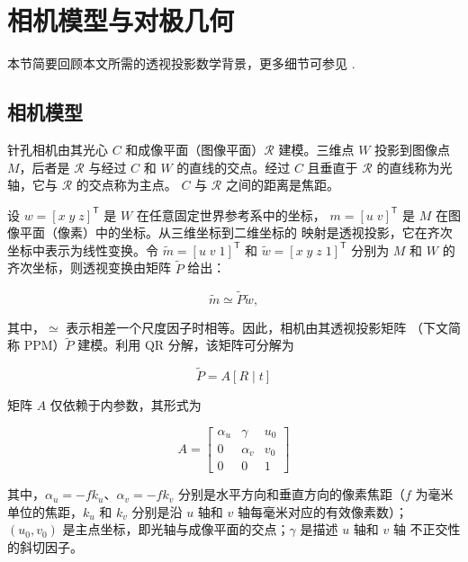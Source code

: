 
\section{相机模型与对极几何}
\label{sec:camera-model-epipolar-geometry}

本节简要回顾本文所需的透视投影数学背景，更多细节可参见
\citet{faugeras1993}.

\subsection{相机模型}
\label{sec:camera-model}

针孔相机由其光心 $C$ 和成像平面（图像平面）$\mathcal{R}$ 建模。三维点
$W$ 投影到图像点 $M$，后者是 $\mathcal{R}$ 与经过 $C$ 和 $W$ 的直线的交点。经过
$C$ 且垂直于 $\mathcal{R}$ 的直线称为光轴，它与 $\mathcal{R}$ 的交点称为主点。
$C$ 与 $\mathcal{R}$ 之间的距离是焦距。

设 $w=[x\;y\;z]^{\mathsf T}$ 是 $W$ 在任意固定世界参考系中的坐标，
$m=[u\;v]^{\mathsf T}$ 是 $M$ 在图像平面（像素）中的坐标。从三维坐标到二维坐标的
映射是透视投影，它在齐次坐标中表示为线性变换。令
$\tilde{m}=[u\;v\;1]^{\mathsf T}$ 和 $\tilde{w}=[x\;y\;z\;1]^{\mathsf T}$ 分别为
$M$ 和 $W$ 的齐次坐标，则透视变换由矩阵 $\widetilde{P}$ 给出：

\begin{equation}
  \tilde{m}\simeq \widetilde{P}\tilde{w},
  \label{eq:perspective-projection}
\end{equation}

其中，$\simeq$ 表示相差一个尺度因子时相等。因此，相机由其透视投影矩阵
（下文简称 PPM）$\widetilde{P}$ 建模。利用 QR 分解，该矩阵可分解为

\begin{equation}
  \widetilde{P}=A[R\mid t]
  \label{eq:ppm-factorization}
\end{equation}

矩阵 $A$ 仅依赖于内参数，其形式为

\begin{equation}
  A=
  \begin{bmatrix}
    \alpha_u & \gamma & u_0\\
    0 & \alpha_v & v_0\\
    0 & 0 & 1
  \end{bmatrix}
  \label{eq:intrinsic-matrix}
\end{equation}

其中，$\alpha_u=-f k_u$、$\alpha_v=-f k_v$ 分别是水平方向和垂直方向的像素焦距（$f$
为毫米单位的焦距，$k_u$ 和 $k_v$ 分别是沿 $u$ 轴和 $v$ 轴每毫米对应的有效像素数）；
$(u_0,v_0)$ 是主点坐标，即光轴与成像平面的交点；$\gamma$ 是描述 $u$ 轴和 $v$ 轴
不正交性的斜切因子。

